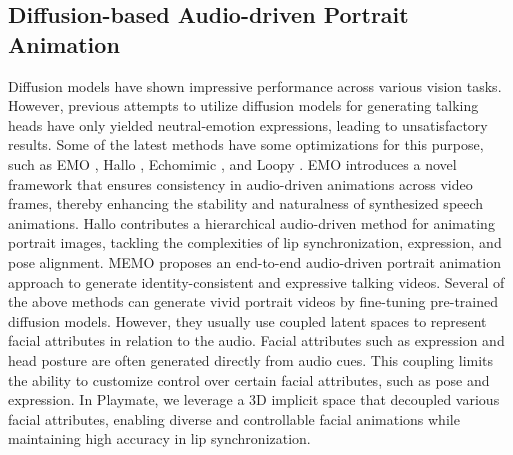 \subsection{Diffusion-based Audio-driven Portrait Animation}
Diffusion models have shown impressive performance across various vision tasks. However, previous \cite{bigioi2024speech,mukhopadhyay2024diff2lip,shen2023difftalk} attempts to utilize diffusion models for generating talking heads have only yielded neutral-emotion expressions, leading to unsatisfactory results. Some of the latest methods have some optimizations for this purpose, such as EMO \cite{tian2025emo}, Hallo \cite{xu2024hallo}, Echomimic \cite{chen2024echomimic}, and Loopy \cite{jiang2024loopy}. EMO introduces a novel framework that ensures consistency in audio-driven animations across video frames, thereby enhancing the stability and naturalness of synthesized speech animations. Hallo contributes a hierarchical audio-driven method for animating portrait images, tackling the complexities of lip synchronization, expression, and pose alignment. MEMO \cite{zheng2024memo} proposes an end-to-end audio-driven portrait animation approach to generate identity-consistent and expressive talking videos. Several of the above methods can generate vivid portrait videos by fine-tuning pre-trained diffusion models. However, they usually use coupled latent spaces to represent facial attributes in relation to the audio. Facial attributes such as expression and head posture are often generated directly from audio cues. This coupling limits the ability to customize control over certain facial attributes, such as pose and expression. In Playmate, we leverage a 3D implicit space that decoupled various facial attributes, enabling diverse and controllable facial animations while maintaining high accuracy in lip synchronization. 

